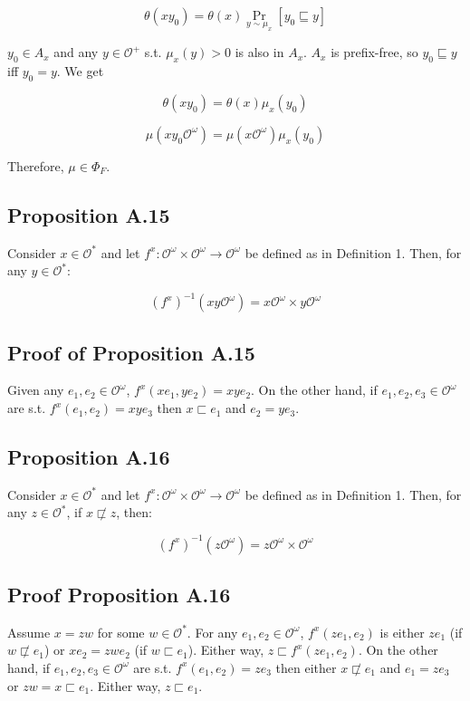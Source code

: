 \documentclass[a4paper]{article}
\DeclareMathOperator{\Prb}{Pr}
\newcommand{\Obs}{\mathcal{O}}
\newcommand{\ObsO}{\Obs^\omega}
\begin{document}
$$\theta(xy_0)=\theta(x) \Prb_{y \sim \mu_x}[y_0 \sqsubseteq y]$$

${y_0 \in A_x}$ and any ${y \in \Obs^+}$ s.t. ${\mu_x(y) > 0}$ is also in ${A_x}$. ${A_x}$ is prefix-free, so ${y_0 \sqsubseteq y}$ iff ${y_0 = y}$. We get

$$\theta(xy_0)=\theta(x) \mu_x(y_0)$$

$$\mu(xy_0 \ObsO)=\mu(x\ObsO) \mu_x(y_0)$$

Therefore, ${\mu \in \Phi_F}$.

\subsection{Proposition A.15}

Consider ${x \in \Obs^*}$ and let ${f^x: \ObsO \times \ObsO \rightarrow \ObsO}$ be defined as in Definition 1. Then, for any ${y \in \Obs^*}$:

$${(f^x)^{-1}(xy\ObsO) = x\ObsO \times y\ObsO}$$

\subsection{Proof of Proposition A.15}

Given any ${e_1,e_2 \in \ObsO}$, ${f^x(xe_1,ye_2)=xye_2}$. On the other hand, if ${e_1,e_2,e_3 \in \ObsO}$ are s.t. ${f^x(e_1,e_2)=xye_3}$ then ${x \sqsubset e_1}$ and ${e_2=ye_3}$.

\subsection{Proposition A.16}

Consider ${x \in \Obs^*}$ and let ${f^x: \ObsO \times \ObsO \rightarrow \ObsO}$ be defined as in Definition 1. Then, for any ${z \in \Obs^*}$, if ${x \not\sqsubset z}$, then:

$${(f^x)^{-1}(z\ObsO) = z\ObsO \times \ObsO}$$

\subsection{Proof Proposition A.16}

Assume ${x = zw}$ for some ${w \in \Obs^*}$. For any ${e_1,e_2 \in \ObsO}$, ${f^x(ze_1,e_2)}$ is either ${ze_1}$ (if $w \not\sqsubset e_1$) or ${xe_2=zwe_2}$ (if ${w \sqsubset e_1}$). Either way, ${z \sqsubset f^x(ze_1,e_2)}$. On the other hand, if ${e_1,e_2,e_3 \in \ObsO}$ are s.t. ${f^x(e_1,e_2)=ze_3}$ then either ${x \not\sqsubset e_1}$ and ${e_1 = ze_3}$ or ${zw = x \sqsubset e_1}$. Either way, ${z \sqsubset e_1}$.
\end{document}
